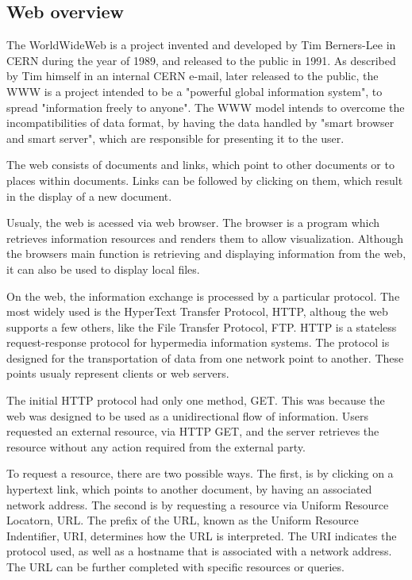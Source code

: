 \subsection{Web overview}

The WorldWideWeb is a project invented and developed by Tim Berners-Lee in CERN
during the year of 1989, and released to the public in 1991. As described by
Tim himself in an internal CERN e-mail, later released to the public,
the WWW is a project intended to be a "powerful global information system",
to spread "information freely to anyone". The WWW model intends to overcome
the incompatibilities of data format, by having the data handled by
"smart browser and smart server", which are responsible for presenting it to the user.

The web consists of documents and links,
which point to other documents or to places within documents. Links
can be followed by clicking on them, which result in the display of a new document.

Usualy, the web is acessed via web browser. The browser is a program
which retrieves information resources and renders
them to allow visualization. Although the browsers main function is retrieving and displaying
information from the web, it can also be used to display local files.

On the web, the information exchange is processed by a particular protocol. The
most widely used is the HyperText Transfer Protocol, HTTP, althoug the web supports
a few others, like the File Transfer Protocol, FTP.
HTTP is a stateless request-response protocol for hypermedia information systems.
The protocol is designed for the transportation of data from one network point
to another. These points usualy represent clients or web servers.

The initial HTTP protocol had only one method, GET. This was because the web
was designed to be used as a unidirectional flow of information.
Users requested an external resource, via HTTP GET, and the server
retrieves the resource without any action required from the external party.

To request a resource, there are two possible ways. The first, is by clicking on a
hypertext link, which points to another document, by having an associated network address.
The second is by requesting a resource via Uniform Resource Locatorn, URL.
The prefix of the URL, known as the Uniform Resource Indentifier, URI, determines
how the URL is interpreted. The URI indicates the protocol used, as well as a hostname
that is associated with a network address. The URL can be further completed with
specific resources or queries.

